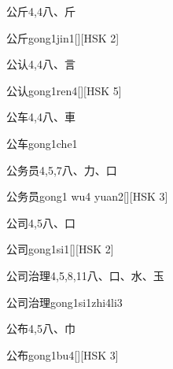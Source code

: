 \begin{entry}{公斤}{4,4}{⼋、⽄}
  \begin{phonetics}{公斤}{gong1jin1}[][HSK 2]
  \end{phonetics}
\end{entry}

\begin{entry}{公认}{4,4}{⼋、⾔}
  \begin{phonetics}{公认}{gong1ren4}[][HSK 5]
  \end{phonetics}
\end{entry}

\begin{entry}{公车}{4,4}{⼋、⾞}
  \begin{phonetics}{公车}{gong1che1}
  \end{phonetics}
\end{entry}

\begin{entry}{公务员}{4,5,7}{⼋、⼒、⼝}
  \begin{phonetics}{公务员}{gong1 wu4 yuan2}[][HSK 3]
  \end{phonetics}
\end{entry}

\begin{entry}{公司}{4,5}{⼋、⼝}
  \begin{phonetics}{公司}{gong1si1}[][HSK 2]
  \end{phonetics}
\end{entry}

\begin{entry}{公司治理}{4,5,8,11}{⼋、⼝、⽔、⽟}
  \begin{phonetics}{公司治理}{gong1si1zhi4li3}
  \end{phonetics}
\end{entry}

\begin{entry}{公布}{4,5}{⼋、⼱}
  \begin{phonetics}{公布}{gong1bu4}[][HSK 3]
  \end{phonetics}
\end{entry}

